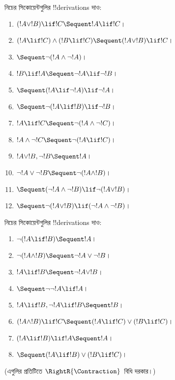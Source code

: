 \documentclass[../../../include/open-logic-section]{subfiles}
\begin{document}
\begin{prob}
নিচের সিকোয়েন্টগুলির !!{derivation}s দাও:
\begin{enumerate}
\item $(!A \lor !B) \lif !C \Sequent !A \lif !C$।
\item $(!A \lif !C) \land (!B \lif !C) \Sequent (!A \lor !B) \lif !C$।
\item $\Sequent \lnot(!A \land \lnot !A)$।
\item $!B \lif !A \Sequent \lnot !A \lif \lnot !B$।
\item $\Sequent (!A \lif \lnot !A) \lif \lnot !A$।
\item $\Sequent \lnot(!A \lif !B) \lif \lnot !B$।
\item $!A \lif !C \Sequent \lnot (!A \land \lnot !C)$।
\item $!A \land \lnot !C \Sequent \lnot (!A \lif !C)$।
\item $!A \lor !B, \lnot !B \Sequent !A$।
\item $\lnot !A \lor \lnot !B \Sequent \lnot(!A \land !B)$।
\item $\Sequent (\lnot !A \land \lnot !B) \lif\lnot(!A \lor !B)$।
\item $\Sequent \lnot(!A \lor !B) \lif (\lnot !A \land \lnot !B)$।
\end{enumerate}
\end{prob}

\begin{prob}
নিচের সিকোয়েন্টগুলির !!{derivation}s দাও:
\begin{enumerate}
\item $\lnot(!A \lif !B) \Sequent !A$।
\item $\lnot(!A \land !B) \Sequent \lnot !A \lor \lnot !B$।
\item $!A \lif !B \Sequent \lnot !A \lor !B$।
\item $\Sequent \lnot \lnot !A \lif !A$।
\item $!A \lif !B, \lnot !A \lif !B \Sequent !B$।
\item $(!A \land !B) \lif !C \Sequent (!A \lif !C) \lor (!B \lif !C)$।
\item $(!A \lif !B) \lif !A \Sequent !A$।
\item $\Sequent (!A \lif !B) \lor (!B \lif !C)$।
\end{enumerate}
(এগুলির প্রতিটিতে $\RightR{\Contraction}$~বিধি দরকার।)
\end{prob}
\end{document}
